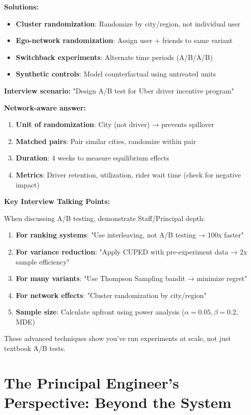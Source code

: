 \documentclass[10pt]{article}
\begin{document}
\textbf{Solutions:}
\begin{itemize}
\item \textbf{Cluster randomization}: Randomize by city/region, not individual user
\item \textbf{Ego-network randomization}: Assign user + friends to same variant
\item \textbf{Switchback experiments}: Alternate time periods (A/B/A/B)
\item \textbf{Synthetic controls}: Model counterfactual using untreated units
\end{itemize}

\textbf{Interview scenario:} "Design A/B test for Uber driver incentive program"

\textbf{Network-aware answer:}
\begin{enumerate}
\item \textbf{Unit of randomization}: City (not driver) → prevents spillover
\item \textbf{Matched pairs}: Pair similar cities, randomize within pair
\item \textbf{Duration}: 4 weeks to measure equilibrium effects
\item \textbf{Metrics}: Driver retention, utilization, rider wait time (check for negative impact)
\end{enumerate}

\textbf{Key Interview Talking Points:}

When discussing A/B testing, demonstrate Staff/Principal depth:
\begin{enumerate}
\item \textbf{For ranking systems}: "Use interleaving, not A/B testing → 100x faster"
\item \textbf{For variance reduction}: "Apply CUPED with pre-experiment data → 2x sample efficiency"
\item \textbf{For many variants}: "Use Thompson Sampling bandit → minimize regret"
\item \textbf{For network effects}: "Cluster randomization by city/region"
\item \textbf{Sample size}: Calculate upfront using power analysis ($\alpha=0.05, \beta=0.2$, MDE)
\end{enumerate}

These advanced techniques show you've run experiments at scale, not just textbook A/B tests.

\section{The Principal Engineer's Perspective: Beyond the System}
\end{document}
